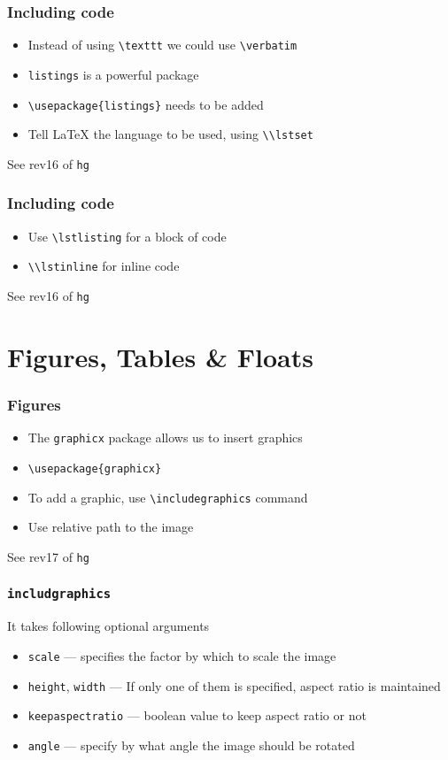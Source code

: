 \documentclass{beamer}
\newcommand{\typ}[1]{\lstinline{#1}}
\begin{document}
\begin{frame}[fragile]
  \frametitle{Including code}
  \begin{itemize}
  \item Instead of using \lstinline{\texttt} we could use
    \lstinline{\verbatim} 
  \item \lstinline+listings+ is a powerful package
  \item \lstinline+\usepackage{listings}+ needs to be added 
  \item Tell {\LaTeX} the language to be used, using \typ{\\lstset}
  \end{itemize}
  \tiny See rev16 of \typ{hg}
\end{frame}

\begin{frame}[fragile]
  \frametitle{Including code}
  \begin{itemize}
  \item Use \lstinline+\lstlisting+ for a block of code
  \item \typ{\\lstinline} for inline code
  \end{itemize}
  \tiny See rev16 of \typ{hg}
\end{frame}

\section{Figures, Tables \& Floats}
\begin{frame}[fragile]
  \frametitle{Figures}
  \begin{itemize}
  \item The \typ{graphicx} package allows us to insert graphics
  \item \lstinline+\usepackage{graphicx}+
  \item To add a graphic, use \lstinline{\includegraphics} command
  \item Use relative path to the image
  \end{itemize}
  \tiny See rev17 of \typ{hg}
\end{frame}

\begin{frame}[fragile]
  \frametitle{\lstinline{includgraphics}}
  It takes following optional arguments
  \begin{itemize}
  \item \lstinline+scale+ --- specifies the factor by which to scale
    the image 
  \item \lstinline+height+, \lstinline+width+ --- If only one of them
    is specified, aspect ratio is maintained 
  \item \lstinline+keepaspectratio+ --- boolean value to keep aspect
    ratio or not 
  \item \lstinline+angle+ --- specify by what angle the image should
    be rotated 
  \end{itemize}
\end{frame}
\end{document}
